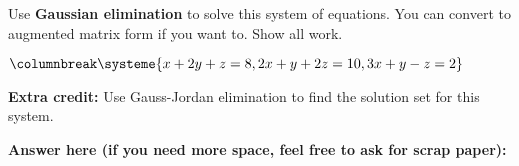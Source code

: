 \documentclass{exam}
\begin{document}
\begin{questions}

\newpage

\question
\begin{multicols}{2}
Use \textbf{Gaussian elimination} to solve this system of equations.  You can convert to augmented matrix form if you want to.  Show all work.


$
\columnbreak
{}
$
\end{multicols}

\textbf{Extra credit: } Use Gauss-Jordan elimination to find the solution set for this system.

\textbf{Answer here (if you need more space, feel free to ask for scrap paper): }

\end{questions}

\thispagestyle{empty}
\end{document}
